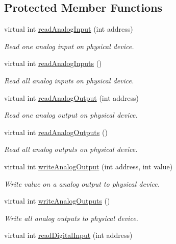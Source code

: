 \subsection*{Protected Member Functions}
\begin{DoxyCompactItemize}
\item 
virtual int \hyperlink{classmdt_device_ae0948ed309354e4d8b231eb911196749}{readAnalogInput} (int address)
\begin{DoxyCompactList}\small\item\em Read one analog input on physical device. \end{DoxyCompactList}\item 
virtual int \hyperlink{classmdt_device_ac0023742214c29bdadd46383ae240972}{readAnalogInputs} ()
\begin{DoxyCompactList}\small\item\em Read all analog inputs on physical device. \end{DoxyCompactList}\item 
virtual int \hyperlink{classmdt_device_abf222c1bd18ba300eeacd6037e5015df}{readAnalogOutput} (int address)
\begin{DoxyCompactList}\small\item\em Read one analog output on physical device. \end{DoxyCompactList}\item 
virtual int \hyperlink{classmdt_device_ae0a0f03cb5267232d176896acc80872c}{readAnalogOutputs} ()
\begin{DoxyCompactList}\small\item\em Read all analog outputs on physical device. \end{DoxyCompactList}\item 
virtual int \hyperlink{classmdt_device_a3d11f48e7b605a54c884977b773615e2}{writeAnalogOutput} (int address, int value)
\begin{DoxyCompactList}\small\item\em Write value on a analog output to physical device. \end{DoxyCompactList}\item 
virtual int \hyperlink{classmdt_device_a797eeb704d5104b7a4411ebeecb018c6}{writeAnalogOutputs} ()
\begin{DoxyCompactList}\small\item\em Write all analog outputs to physical device. \end{DoxyCompactList}\item 
virtual int \hyperlink{classmdt_device_a7e8f070a89d8f6f104f2cc5001f5c0d6}{readDigitalInput} (int address)

\end{DoxyCompactItemize}
